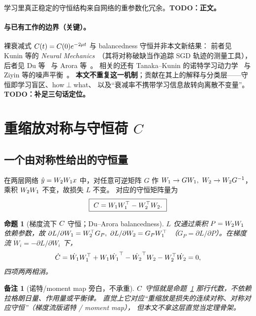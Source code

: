 \documentclass[11pt]{article}
\newtheorem{Proposition}[Theorem]{命题}
\newtheorem{Remark}[Theorem]{备注}
\begin{document}
学习里真正稳定的守恒结构来自网络的重参数化冗余。\textbf{TODO：正文。}

\paragraph{与已有工作的边界（关键）。}
裸衰减式 $C(t)=C(0)e^{-2\mu t}$ 与 balancedness 守恒并非本文新结果：
前者见 Kunin 等的 \emph{Neural Mechanics}~\citep{kunin2021neural}（其将对称破缺当作追踪
SGD 轨迹的测量工具），后者见 Du 等~\citep{du2018algorithmic} 与 Arora 等~\citep{arora2018optimization}。
相关的还有 Tanaka--Kunin 的诺特学习动力学~\citep{tanaka2021noether} 与 Ziyin 等的噪声平衡~\citep{ziyin2024parameter}。
\textbf{本文不重复这一机制}；贡献在其上的解释与分类层——守恒即学习盲区、how$\perp$what、
以及“衰减率不携带学习信息故转向离散不变量”。\textbf{TODO：补足三句话定位。}

\section{重缩放对称与守恒荷 \texorpdfstring{$C$}{C}}\label{sec:setup}

\subsection{一个由对称性给出的守恒量}\label{sec:setup:charge}
在两层网络 $\hat y = W_2W_1 x$ 中，对任意可逆矩阵 $G$ 作
$W_1 \to GW_1,\ W_2 \to W_2 G^{-1}$，乘积 $W_2W_1$ 不变，故损失 $L$ 不变。
对应的守恒矩阵量为
\begin{equation}\label{eq:Cdef}
  \boxed{\ C = W_1W_1^\top - W_2^\top W_2.\ }
\end{equation}

\begin{Proposition}[梯度流下 $C$ 守恒；Du--Arora balancedness]\label{prop:conserved}
$L$ 仅通过乘积 $P=W_2W_1$ 依赖参数，故
$\partial L/\partial\Wone = \Wtwo^\top G_P,\ \partial L/\partial\Wtwo = G_P\Wone^\top$
（$G_P=\partial L/\partial P$）。在梯度流 $\dot W_i = -\partial L/\partial W_i$ 下，
\[
  \dot{C} = \dot{W_1}W_1^\top + W_1\dot{W_1}^\top
            - \dot{W_2}^\top W_2 - W_2^\top\dot{W_2} = 0,
\]
四项两两相消。
\end{Proposition}

\begin{Remark}[诺特/moment map 旁白，不承重]
$C$ 守恒就是命题~\ref{prop:conserved} 那行代数，不依赖拉格朗日量、作用量或平衡律。
直觉上它对应“重缩放是损失的连续对称、对称对应守恒”（梯度流版诺特 / moment map），
但本文不拿这层直觉当定理骨架。
\end{Remark}
\end{document}
